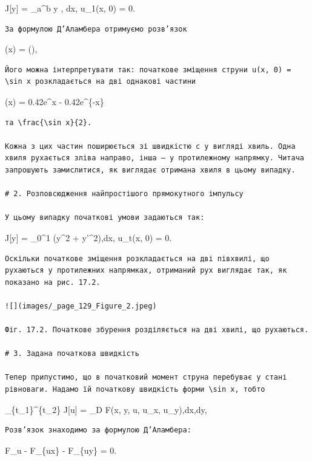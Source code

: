 \documentclass[
  ukrainian,
]{article}
\begin{document}
J{[}y{]} = \int\_a\^{}b y  , dx, u\_1(x, 0) = 0.

\begin{verbatim}
За формулою Д’Аламбера отримуємо розв’язок
\end{verbatim}

(x) =
\alpha {}\left(\right),

\begin{verbatim}
Його можна інтерпретувати так: початкове зміщення струни u(x, 0) = \sin x розкладається на дві однакові частини
\end{verbatim}

(x) = 0.42e\^{}x - 0.42e\^{}\{-x\}

\begin{verbatim}
та \frac{\sin x}{2}.

Кожна з цих частин поширюється зі швидкістю c у вигляді хвиль. Одна хвиля рухається зліва направо, інша — у протилежному напрямку. Читача запрошують замислитися, як виглядає отримана хвиля в цьому випадку.

# 2. Розповсюдження найпростішого прямокутного імпульсу

У цьому випадку початкові умови задаються так:
\end{verbatim}

J{[}y{]} = \int\_0\^{}1 (y\^{}2 + y'\^{}2),dx, u\_t(x, 0) = 0.

\begin{verbatim}
Оскільки початкове зміщення розкладається на дві півхвилі, що рухаються у протилежних напрямках, отриманий рух виглядає так, як показано на рис. 17.2.

![](images/_page_129_Figure_2.jpeg)

Фіг. 17.2. Початкове збурення розділяється на дві хвилі, що рухаються.

# 3. Задана початкова швидкість

Тепер припустимо, що в початковий момент струна перебуває у стані рівноваги. Надамо їй початкову швидкість форми \sin x, тобто
\end{verbatim}

\int\limits\_\{t\_1\}\^{}\{t\_2\} J{[}u{]} = \iint\limits\_D F(x, y, u,
u\_x, u\_y),dx,dy,

\begin{verbatim}
Розв’язок знаходимо за формулою Д’Аламбера:
\end{verbatim}

F\_u - F\_\{ux\} -
F\_\{uy\} = 0.
\end{document}
